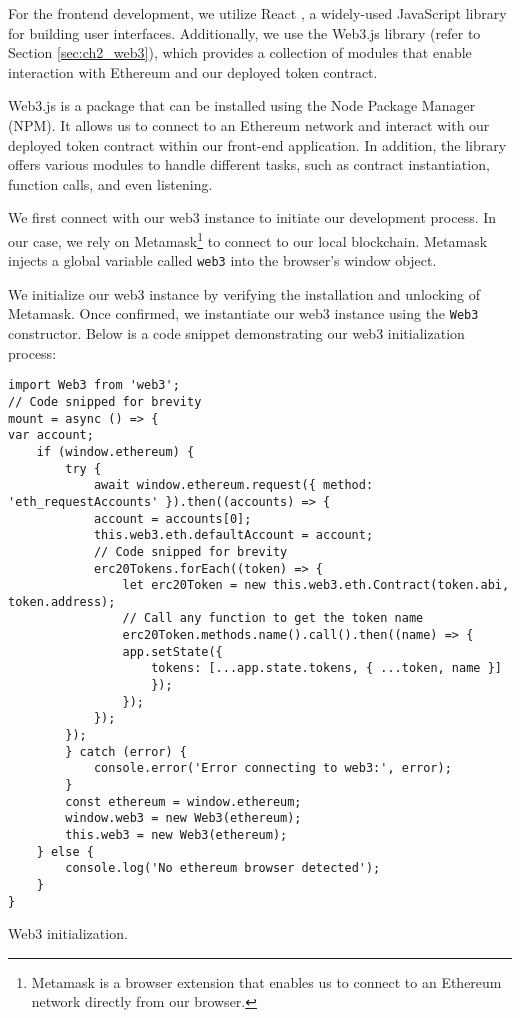 For the frontend development, we utilize React \cite{react}, a widely-used JavaScript library for building user interfaces. Additionally, we use the Web3.js \cite{eth_web3js}
library (refer to Section \ref{sec:ch2_web3}), which provides a collection of modules that enable interaction with Ethereum and our deployed token contract.

Web3.js is a package that can be installed using the Node Package Manager (NPM). It allows us to connect to an Ethereum network and interact with our deployed token contract within our front-end application. In addition, the library offers various modules to handle different tasks, such as contract instantiation, function calls,
and even listening.

We first connect with our web3 instance to initiate our development process. In our case, we rely on Metamask\footnote{Metamask is a browser extension that enables us to connect to an Ethereum network directly from our browser.} to connect to our local blockchain. Metamask injects a global variable called \texttt{web3} into the browser's window object.

We initialize our web3 instance by verifying the installation and unlocking of Metamask. Once confirmed, we instantiate our web3 instance using the \texttt{Web3} constructor. Below is a code snippet demonstrating our web3 initialization process:

\begin{listing}[!ht]
    \begin{verbatim}
import Web3 from 'web3';
// Code snipped for brevity
mount = async () => {
var account;
    if (window.ethereum) {
        try {
            await window.ethereum.request({ method: 'eth_requestAccounts' }).then((accounts) => {
            account = accounts[0];
            this.web3.eth.defaultAccount = account;
            // Code snipped for brevity
            erc20Tokens.forEach((token) => {
                let erc20Token = new this.web3.eth.Contract(token.abi, token.address);
                // Call any function to get the token name
                erc20Token.methods.name().call().then((name) => {
                app.setState({
                    tokens: [...app.state.tokens, { ...token, name }]
                    });
                });
            });
        });
        } catch (error) {
            console.error('Error connecting to web3:', error);
        }
        const ethereum = window.ethereum;
        window.web3 = new Web3(ethereum);
        this.web3 = new Web3(ethereum);
    } else {
        console.log('No ethereum browser detected');
    }
}
    \end{verbatim}
    \caption{Web3 initialization.}
    \label{lst:web3_init}
\end{listing}


